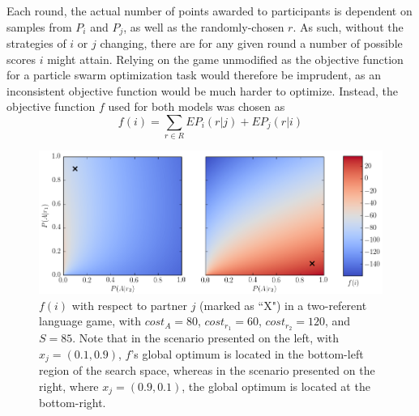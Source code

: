 \documentclass[12pt,a4paper]{article}
\begin{document}
Each round, the actual number of points awarded to participants is dependent on samples from $P_i$ and $P_j$, as well as the randomly-chosen $r$. As such, without the strategies of $i$ or $j$ changing, there are for any given round a number of possible scores $i$ might attain. Relying on the game unmodified as the objective function for a particle swarm optimization task would therefore be imprudent, as an inconsistent objective function would be much harder to optimize. Instead, the objective function $f$ used for both models was chosen as 
\begin{equation}
f(i) = \sum_{r \in R} EP_{i}(r|j) + EP_{j}(r|i)
\end{equation}

\begin{figure}
\centering
\includegraphics[width=\textwidth]{objective_function_cropped.png}
%
\caption{$f(i)$ with respect to partner $j$ (marked as ``X") in a two-referent language game, with $cost_A=80$, $cost_{r_1}=60$, $cost_{r_2}=120$, and $S=85$. Note that in the scenario presented on the left, with $x_j = (0.1, 0.9)$, $f$'s global optimum is located in the bottom-left region of the search space, whereas in the scenario presented on the right, where $x_j = (0.9, 0.1)$, the global optimum is located at the bottom-right.}
\label{fig:1}
\end{figure}
\end{document}

